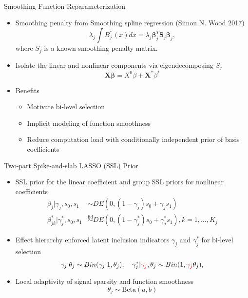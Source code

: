 \documentclass[
  ignorenonframetext,
  aspectratio=169]{beamer}
\providecommand{\tightlist}{%
  \setlength{\itemsep}{0pt}\setlength{\parskip}{0pt}}
\newcommand{\bs}[1]{\boldsymbol{#1}}
\newcommand{\tp}{*}
\newcommand{\simiid}{\overset{\text{iid}}{\sim}}
\newcommand{\bg}[1]{\textcolor{red}{#1}}
\begin{document}
\begin{frame}{Smoothing Function Reparameterization}
\protect\hypertarget{smoothing-function-reparameterization}{}
\begin{itemize}
\item
  Smoothing penalty from Smoothing spline regression (Simon N. Wood
  2017) \[
  \lambda_j \int B^{\prime\prime}_j(x)dx = \lambda_j \bs \beta_j^T \bs S_j \bs \beta_j,
  \] where \(S_j\) is a known smoothing penalty matrix.
\item
  Isolate the linear and nonlinear components via eigendecomposing
  \(S_j\) \[\bm X \bm \beta = X^{0} \beta + \bs X^\tp\beta^\tp\]
\item
  Benefits

  \begin{itemize}
  \tightlist
  \item
    Motivate bi-level selection
  \item
    Implicit modeling of function smoothness
  \item
    Reduce computation load with conditionally independent prior of
    basis coefficients
  \end{itemize}
\end{itemize}
\end{frame}

\begin{frame}{Two-part Spike-and-slab LASSO (SSL) Prior}
\protect\hypertarget{two-part-spike-and-slab-lasso-ssl-prior}{}
\begin{itemize}
\tightlist
\item
  SSL prior for the linear coefficient and group SSL priors for
  nonlinear coefficients \begin{align*}
  \beta_{j} |\gamma_{j},s_0,s_1 &\sim DE(0,(1-\gamma_{j}) s_0 + \gamma_{j} s_1) \\
  \beta^\tp_{jk} | \gamma^\tp_{j},s_0,s_1 &\simiid DE(0,(1-\gamma^\tp_{j}) s_0 + \gamma^\tp_{j} s_1), k = 1, \dots, K_j
  \end{align*}
\item
  Effect hierarchy enforced latent inclusion indicators \(\gamma_j\) and
  \(\gamma^\tp_{j}\) for bi-level selection \[
  \gamma_{j} | \theta_j \sim Bin(\gamma_{j}|1, \theta_j),\quad
  \gamma_{j}^\tp | \bg{\gamma_{j}}, \theta_j \sim Bin(1, \bg{\gamma_{j}}\theta_j),
  \]
\item
  Local adaptivity of signal sparsity and function smoothness \[
  \theta_j \sim \text{Beta}(a,b)
  \]
\end{itemize}
\end{frame}
\end{document}
